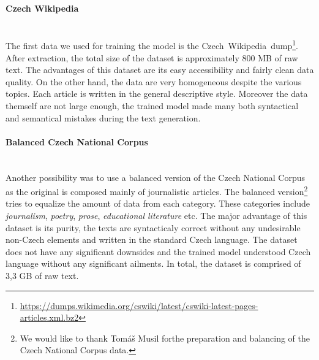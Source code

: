 \paragraph*{Czech Wikipedia} ~\\
\indent The first data we used for training the model is the Czech~Wikipedia~dump\footnote[2]{\url{https://dumps.wikimedia.org/cswiki/latest/cswiki-latest-pages-articles.xml.bz2}}. After extraction, the total size of the dataset is approximately 800 MB of raw text. The advantages of this dataset are its easy accessibility and fairly clean data quality. On the other hand, the data are very homogeneous despite the various topics. Each article is written in the general descriptive style. Moreover the data themself are not large enough, the trained model made many both syntactical and semantical mistakes during the text generation.

\paragraph*{Balanced Czech National Corpus} ~\\
\indent Another possibility was to use a balanced version of the Czech National Corpus\citep{11234/1-4635} as the original is composed mainly of journalistic articles. The balanced version\footnote[3]{We would like to thank Tomáš Musil forthe preparation and balancing of the Czech National Corpus data.} tries to equalize the amount of data from each category. These categories include \textit{journalism}, \textit{poetry}, \textit{prose}, \textit{educational literature} etc. The major advantage of this dataset is its purity, the texts are syntacticaly correct without any undesirable non-Czech elements and written in the standard Czech language. The dataset does not have any significant downsides and the trained model understood Czech language without any significant ailments. In total, the dataset is comprised of 3,3 GB of raw text.

